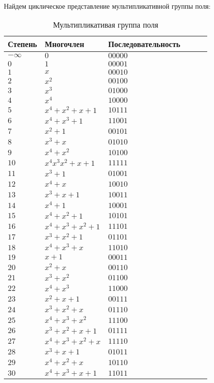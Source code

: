 \documentclass{article}
\begin{document}
Найдем циклическое представление мультипликативной группы поля:
\begin{table}[H]
\centering
\caption{Мультипликативая группа поля}
\begin{tabular}{|l|l|l|l|l|l|}
\hline
Степень & Многочлен &  Последовательность \\ \hline
$-\infty$ & $0$ & $00000$ \\
$0$ & $1$ & $00001$ \\
$1$ & $x$ & $00010$ \\
$2$ & $x^{2}$ & $00100$ \\
$3$ & $x^{3}$ & $01000$ \\
$4$ & $x^{4}$ & $10000$ \\
$5$ & $x^{4}+x^{2}+x+1$ & $10111$ \\
$6$ & $x^{4}+x^{3}+1$ & $11001$ \\
$7$ & $x^{2}+1$ & $00101$ \\
$8$ & $x^{3}+x$ & $01010$ \\
$9$ & $x^{4}+x^{2}$ & $10100$ \\
$10$ & $x^{4}x^{3}x^{2}+x+1$ & $11111$ \\
$11$ & $x^{3}+1$ & $01001$ \\
$12$ & $x^{4}+x$ & $10010$ \\
$13$ & $x^{3}+x+1$ & $10011$ \\
$14$ & $x^{4}+1$ & $10001$ \\
$15$ & $x^{4}+x^{2}+1$ & $10101$ \\
$16$ & $x^{4}+x^{3}+x^{2}+1$ & $11101$ \\
$17$ & $x^{3}+x^{2}+1$ & $01101$ \\
$18$ & $x^{4}+x^{3}+x$ & $11010$ \\
$19$ & $x+1$ & $00011$ \\
$20$ & $x^{2}+x$ & $00110$ \\
$21$ & $x^{3}+x^{2}$ & $01100$ \\
$22$ & $x^{4}+x^{3}$ & $11000$ \\
$23$ & $x^{2}+x+1$ & $00111$ \\
$24$ & $x^{3}+x^{2}+x$ & $01110$ \\
$25$ & $x^{4}+x^{3}+x^{2}$ & $11100$ \\
$26$ & $x^{3}+x^{2}+x+1$ & $01111$ \\
$27$ & $x^{4}+x^{3}+x^{2}+x$ & $11110$ \\
$28$ & $x^{3}+x+1$ & $01011$ \\
$29$ & $x^{4}+x^{2}+x$ & $10110$ \\
$30$ & $x^{4}+x^{3}+x+1$ & $11011$ \\
\hline
\end{tabular}
\end{table}
\end{document}
